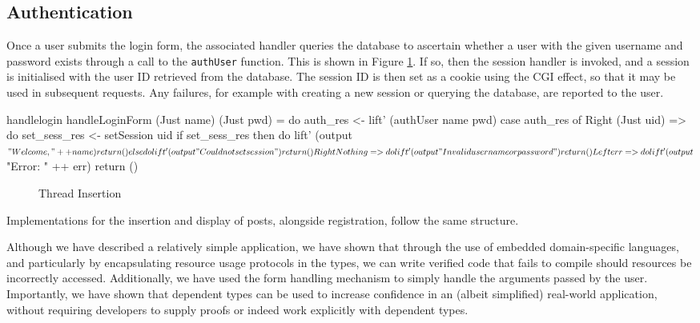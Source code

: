 \subsection{Authentication}

Once a user submits the login form, the associated handler queries the database
to ascertain whether a user with the given username and password exists through
a call to the \texttt{authUser} function. This is shown in Figure
\ref{fig:handlelogin}. If so, then the session handler is
invoked, and a session is initialised with the user ID retrieved from the
database. The session ID is then set as a cookie using the CGI effect, so that
it may be used in subsequent requests. Any failures, for example with creating
a new session or querying the database, are reported to the user.

\begin{SaveVerbatim}{handlelogin}
handleLoginForm (Just name) (Just pwd) = do
  auth_res <- lift' (authUser name pwd)
  case auth_res of
    Right (Just uid) => do
      set_sess_res <- setSession uid
      if set_sess_res then do
        lift' (output $ "Welcome, " ++ name)
        return ()
      else do
        lift' (output "Could not set session")
         return ()
    Right Nothing => do
      lift' (output "Invalid username or password")
      return ()
    Left err => do
      lift' (output $ "Error: " ++ err)
      return ()
\end{SaveVerbatim}

\begin{figure}[h]
\caption{Thread Insertion}
\label{fig:handlelogin}
\end{figure}

Implementations for the insertion and display of posts, alongside registration,
follow the same structure.

Although we have described a relatively simple application, we have shown that
through the use of embedded domain-specific languages, 
and particularly by encapsulating resource usage protocols in the types,
we can write verified
code that fails to compile should resources be incorrectly accessed.
Additionally, we have used the form handling mechanism to simply handle the
arguments passed by the user. Importantly, we have shown that dependent types
can be used to increase confidence in an (albeit simplified) real-world
application, without requiring developers to supply proofs or indeed work
explicitly with dependent types. 

